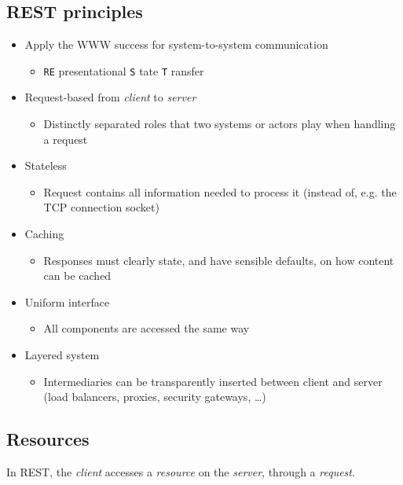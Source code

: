 \documentclass[8pt]{article}
\begin{document}
\subsection{REST principles}
\label{sec:orgf5ce87d}
\begin{itemize}
\item Apply the WWW success for system-to-system communication
\begin{itemize}
\item \texttt{RE} presentational \texttt{S} tate \texttt{T} ransfer
\end{itemize}
\item Request-based from \emph{client} to \emph{server}
\begin{itemize}
\item Distinctly separated roles that two systems or actors play when handling a request
\end{itemize}
\item Stateless
\begin{itemize}
\item Request contains all information needed to process it (instead of, e.g. the TCP connection socket)
\end{itemize}
\item Caching
\begin{itemize}
\item Responses must clearly state, and have sensible defaults, on how content can be cached
\end{itemize}
\item Uniform interface
\begin{itemize}
\item All components are accessed the same way
\end{itemize}
\item Layered system
\begin{itemize}
\item Intermediaries can be transparently inserted between client and server (load balancers, proxies, security gateways, \ldots{})
\end{itemize}
\end{itemize}
\subsection{Resources}
\label{sec:orgcfd1057}
In REST, the \emph{client} accesses a \emph{resource} on the \emph{server}, through a \emph{request}.
\end{document}
